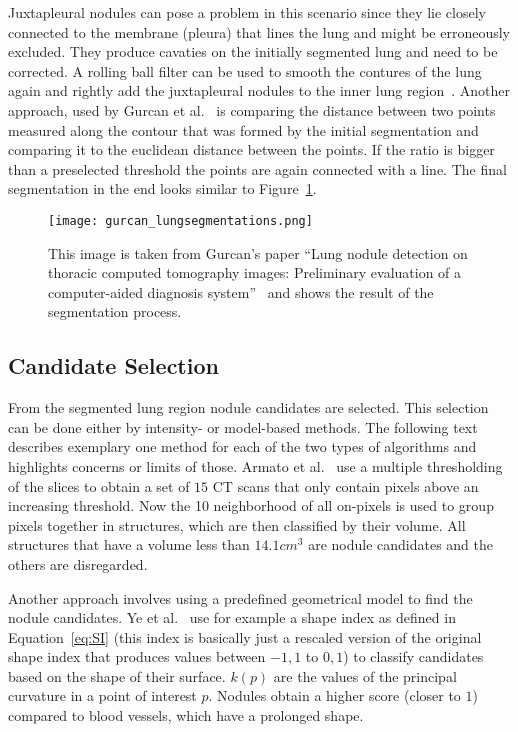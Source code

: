 \documentclass[main.tex]{subfiles}
\begin{document}
Juxtapleural nodules can pose a problem in this scenario since they lie closely connected to the membrane (pleura) that lines the lung and might be erroneously excluded. They produce cavaties on the initially segmented lung and need to be corrected. A rolling ball filter can be used to smooth the contures of the lung again and rightly add the juxtapleural nodules to the inner lung region~\cite{armato1999computerized}. Another approach, used by Gurcan et al.~\cite{gurcan2002lung} is comparing the distance between two points measured along the contour that was formed by the initial segmentation and comparing it to the euclidean distance between the points. If the ratio is bigger than a preselected threshold the points are again connected with a line. The final segmentation in the end looks similar to Figure~\ref{fig:segmentation}.

\begin{figure}[ht]
\centering
\texttt{[image: gurcan\_lungsegmentations.png]}
\caption{This image is taken from Gurcan's paper ``Lung nodule detection on thoracic computed tomography images: Preliminary evaluation of a computer-aided diagnosis system''~\cite{gurcan2002lung} and shows the result of the segmentation process.}
\label{fig:segmentation}
\end{figure}


\subsection{Candidate Selection}
From the segmented lung region nodule candidates are selected. This selection can be done either by intensity- or model-based methods. The following text describes exemplary one method for each of the two types of algorithms and highlights concerns or limits of those. Armato et al.~\cite{armato1999computerized} use a multiple thresholding of the slices to obtain a set of $15$ CT scans that only contain pixels above an increasing threshold. Now the 10 neighborhood of all on-pixels is used to group pixels together in structures, which are then classified by their volume. All structures that have a volume less than $14.1cm^3$ are nodule candidates and the others are disregarded.

Another approach involves using a predefined geometrical model to find the nodule candidates. Ye et al.~\cite{ye2009shape} use for example a shape index as defined in Equation~\ref{eq:SI} (this index is basically just a rescaled version of the original shape index that produces values between $-1,1$ to $0,1$) to classify candidates based on the shape of their surface. $k(p)$ are the values of the principal curvature in a point of interest $p$. Nodules obtain a higher score (closer to $1$) compared to blood vessels, which have a prolonged shape. 
\end{document}
